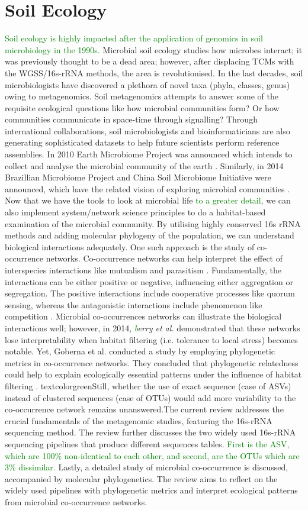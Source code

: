 \section{Soil Ecology}
\textcolor{green}{Soil ecology is highly impacted after the application of genomics in soil microbiology in the 1990s.} Microbial soil ecology studies how microbes interact; it was previously thought to be a dead area; however, after displacing TCMs with the WGSS/16s-rRNA methods, the area is revolutionised. In the last decades, soil microbiologists have discovered a plethora of novel taxa (phyla, classes, genus) owing to metagenomics. Soil metagenomics attempts to answer some of the requisite ecological questions like how microbial communities form? Or how communities communicate in space-time through signalling? Through international collaborations, soil microbiologists and bioinformaticians are also generating sophisticated datasets to help future scientists perform reference assemblies. In 2010 Earth Microbiome Project was announced which intends to collect and analyse the microbial community of the earth \cite{ref6}. Similarly, in 2014 Brazillian Microbiome Project and China Soil Microbiome Initiative were announced, which have the related vision of exploring microbial communities \cite{ref7}\cite{ref8}. Now that we have the tools to look at microbial life \textcolor{green}{to a greater detail}, we can also implement system/network science principles to do a habitat-based examination of the microbial community. By utilising highly conserved 16s rRNA methods and adding molecular phylogeny of the population, we can understand biological interactions adequately. One such approach is the study of co-occurrence networks. Co-occurrence networks can help interpret the effect of interspecies interactions like mutualism and parasitism \cite{ref9}. Fundamentally, the interactions can be either positive or negative, influencing either aggregation or segregation. The positive interactions include cooperative processes like quorum sensing, whereas the antagonistic interactions include phenomenon like competition \cite{ref9}. Microbial co-occurrences networks can illustrate the biological interactions well; however, in 2014, \emph{\textcolor{green}{b}erry et al.} demonstrated that these networks lose interpretability when habitat filtering (i.e. tolerance to local stress) becomes notable. Yet, Goberna et al. conducted a study by employing phylogenetic metrics in co-occurrence networks. They concluded that phylogenetic relatedness could help to explain ecologically essential patterns under the influence of habitat filtering \cite{ref10}. textcolor{green}{Still, whether the use of exact sequence (case of ASVs) instead of clustered sequences (case of OTUs) would add more variability to the co-occurrence network remains unanswered.}\newline \newline The current review addresses the crucial fundamentals of the metagenomic studies, featuring the 16s-rRNA sequencing method. The review further discusses the two widely used 16s-rRNA sequencing pipelines that produce different sequences tables. \textcolor{green}{First is the ASV, which are 100\% non-identical to each other, and second, are the OTUs which are 3\% dissimilar.} Lastly, a detailed study of microbial co-occurrence is discussed, accompanied by molecular phylogenetics. The review aims to reflect on the widely used pipelines with phylogenetic metrics and interpret ecological patterns from microbial co-occurrence networks.